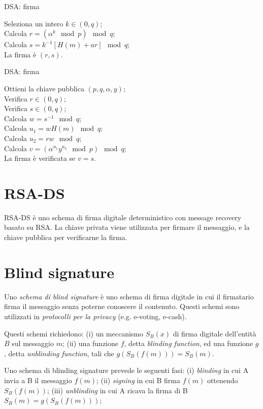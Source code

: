 \bigskip
\begin{algorithm}[H]
  \caption{DSA: firma}
  \label{alg:dsa-signature}
  \SetAlgoNoLine
  Seleziona un intero $k \in (0,q)$;\\
  Calcola $r=(\alpha ^{k} \mod p) \mod q$;\\
  Calcola $s=k^{-1}[H(m)+ar] \mod q$;\\
  La firma è $(r,s)$.
\end{algorithm}

\bigskip
\begin{algorithm}[H]
  \caption{DSA: firma}
  \label{alg:dsa-verification}
  \SetAlgoNoLine
  Ottieni la chiave pubblica $(p,q,\alpha,y)$;\\
  Verifica $r\in (0,q)$;\\
  Verifica $s\in (0,q)$;\\
  Calcola $w=s^{-1} \mod q$;\\
  Calcola $u_{1}=wH(m)\mod q$;\\
  Calcola $u_{2}=rw\mod q$;\\
  Calcola $v=(\alpha^{u_{1}}y^{u_{2}} \mod p) \mod q$;\\
  La firma è verificata se $v=s$.
\end{algorithm}


\section{RSA-DS}
RSA-DS è uno schema di firma digitale deterministico con message recovery basato su RSA.
La chiave privata viene utilizzata per firmare il messaggio, e la chiave pubblica per verificarne la firma.


\section{Blind signature}
Uno \textit{schema di blind signature} è uno schema di firma digitale in cui il firmatario firma il messaggio senza poterne conoscere il contenuto.
Questi schemi sono utilizzati in \textit{protocolli per la privacy} (e.g. e-voting, e-cash).

Questi schemi richiedono:
(i) un meccanismo $S_{B}(x)$ di firma digitale dell'entità $B$ sul messaggio $m$;
(ii) una funzione $f$, detta \textit{blinding function}, ed una funzione $g$, detta \textit{unblinding function}, tali che $g(S_{B}(f(m)))=S_{B}(m)$.

Uno schema di blinding signature prevede le seguenti fasi:
(i) \textit{blinding} in cui A invia a B il messaggio $f(m)$;
(ii) \textit{signing} in cui B firma $f(m)$ ottenendo $S_{B}(f(m))$;
(iii) \textit{unblinding} in cui A ricava la firma di B $S_{B}(m)=g(S_{B}(f(m)))$;

